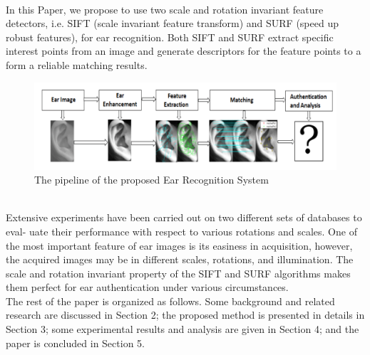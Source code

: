 \\ In this Paper, we propose to use two scale and rotation invariant feature detectors, i.e. SIFT (scale invariant feature transform) and SURF (speed up robust features), for ear recognition. Both SIFT and SURF extract specific interest points from an image and generate descriptors for the feature points to a form a reliable matching results.\\
\begin{figure}[t]
	\includegraphics[width=\textwidth]{Figures/Figure1}
	\caption{The pipeline of the proposed Ear Recognition System}
	\label{fig:Figure1}
\end{figure}
\\Extensive experiments have been carried out on two different sets of databases to eval- uate their performance with respect to various rotations and scales. One of the most important feature of ear images is its easiness in acquisition, however, the acquired images may be in different scales, rotations, and illumination. The scale and rotation invariant property of the SIFT and SURF algorithms makes them perfect for ear authentication under various circumstances.
\\The rest of the paper is organized as follows. Some background and related research are discussed in Section 2; the proposed method is presented in details in Section 3; some experimental results and analysis are given in Section 4; and the paper is concluded in Section 5.
